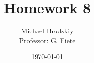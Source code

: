 


\title{Homework 8}
\date{\today}
\author{Michael Brodskiy\\ \small Professor: G. Fiete}



\maketitle

